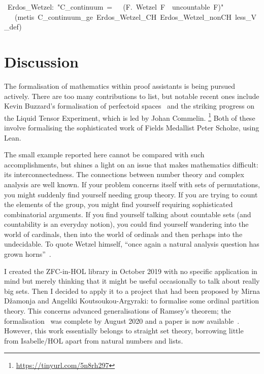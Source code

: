 \documentclass[runningheads]{llncs}
\begin{document}
\begin{isabelle}
\ Erdos\_Wetzel:\ "C\_continuum\ =\ \ \isasymlongleftrightarrow \ (\isasymexists F.\ Wetzel\ F\ \isasymand \ uncountable\ F)"\isanewline
\ \ \ (metis\ C\_continuum\_ge\ Erdos\_Wetzel\_CH\ Erdos\_Wetzel\_nonCH\ less\_V\_def)
\end{isabelle}


\section{Discussion}

The formalisation of mathematics within proof assistants is being pursued actively. There are too many contributions to list, but notable recent ones include Kevin Buzzard's formalisation of perfectoid spaces~\cite{buzzard-perfectoid} and the striking progress on the Liquid Tensor Experiment, which is led by Johan Commelin.%
\footnote{\url{https://tinyurl.com/5n8rh297}}
Both of these involve formalising the sophisticated work of Fields Medallist Peter Scholze, using Lean.

The small example reported here cannot be compared with such accomplishments, but shines a light on an issue that makes mathematics difficult: its interconnectedness. The connections between number theory and complex analysis are well known. If your problem concerns itself with sets of permutations, you might suddenly find yourself needing group theory. If you are trying to count the elements of the group, you might find yourself requiring sophisticated combinatorial arguments. If you find yourself talking about countable sets (and countability is an everyday notion), you could find yourself wandering into the world of cardinals, then into the world of ordinals and then perhaps into the undecidable. To quote Wetzel himself, ``once again a natural analysis question has grown horns''~\cite[p.]{garcia-wetzels-problem}.

I created the ZFC-in-HOL library in October 2019 with no specific application in mind but merely thinking that it might be useful occasionally to talk about really big sets.
Then I decided to apply it to a project that had been proposed by Mirna Džamonja and Angeliki Koutsoukou-Argyraki: to formalise some ordinal partition theory. This concerns advanced generalisations of Ramsey's theorem; the formalisation~\cite{Ordinal_Partitions-AFP} was complete by August 2020 and a paper is now available~\cite{dzamonja-formalising}.
However, this work essentially belongs to straight set theory, borrowing little from Isabelle/HOL apart from natural numbers and lists.
\end{document}
